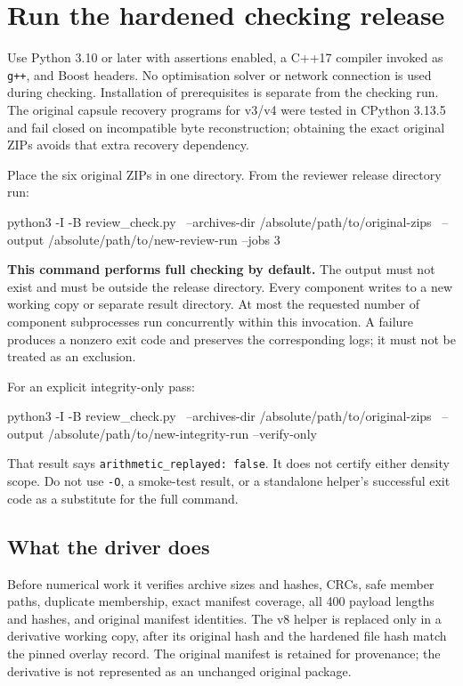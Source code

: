 \documentclass[11pt,a4paper]{article}
\begin{document}
\section{Run the hardened checking release}
Use Python 3.10 or later with assertions enabled, a C++17 compiler invoked as \texttt{g++}, and Boost headers. No optimisation solver or network connection is used during checking. Installation of prerequisites is separate from the checking run. The original capsule recovery programs for v3/v4 were tested in CPython 3.13.5 and fail closed on incompatible byte reconstruction; obtaining the exact original ZIPs avoids that extra recovery dependency.

Place the six original ZIPs in one directory. From the reviewer release directory run:
\begin{Code}
python3 -I -B review_check.py \
  --archives-dir /absolute/path/to/original-zips \
  --output /absolute/path/to/new-review-run --jobs 3
\end{Code}
\textbf{This command performs full checking by default.} The output must not exist and must be outside the release directory. Every component writes to a new working copy or separate result directory. At most the requested number of component subprocesses run concurrently within this invocation. A failure produces a nonzero exit code and preserves the corresponding logs; it must not be treated as an exclusion.

For an explicit integrity-only pass:
\begin{Code}
python3 -I -B review_check.py \
  --archives-dir /absolute/path/to/original-zips \
  --output /absolute/path/to/new-integrity-run --verify-only
\end{Code}
That result says \texttt{arithmetic\_replayed: false}. It does not certify either density scope. Do not use \texttt{-O}, a smoke-test result, or a standalone helper's successful exit code as a substitute for the full command.

\subsection{What the driver does}
Before numerical work it verifies archive sizes and hashes, CRCs, safe member paths, duplicate membership, exact manifest coverage, all 400 payload lengths and hashes, and original manifest identities. The v8 helper is replaced only in a derivative working copy, after its original hash and the hardened file hash match the pinned overlay record. The original manifest is retained for provenance; the derivative is not represented as an unchanged original package.
\end{document}
